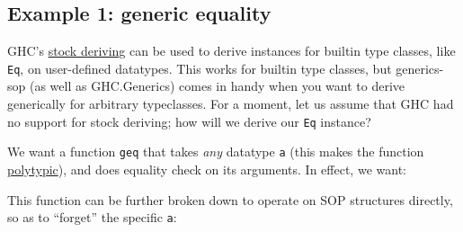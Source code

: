 \hypertarget{example-1-generic-equality}{%
\subsection{Example 1: generic
equality}\label{example-1-generic-equality}}

GHC's
\href{https://ghc.gitlab.haskell.org/ghc/doc/users_guide/exts/deriving_strategies.html\#deriving-strategies}{stock
deriving} can be used to derive instances for builtin type classes, like
\texttt{Eq}, on user-defined datatypes. This works for builtin type
classes, but generics-sop (as well as GHC.Generics) comes in handy when
you want to derive generically for arbitrary typeclasses. For a moment,
let us assume that GHC had no support for stock deriving; how will we
derive our \texttt{Eq} instance?

We want a function \texttt{geq} that takes \emph{any} datatype
\texttt{a} (this makes the function
\href{https://www.sciencedirect.com/science/article/pii/S0167642304000152}{polytypic}),
and does equality check on its arguments. In effect, we want:

\begin{Shaded}
\begin{Highlighting}[]
 \OtherTok{=\textgreater{}}\OtherTok{{-}\textgreater{}}\OtherTok{{-}\textgreater{}} 
\end{Highlighting}
\end{Shaded}

This function can be further broken down to operate on SOP structures
directly, so as to ``forget'' the specific \texttt{a}:

\begin{Shaded}
\begin{Highlighting}[]
  \OtherTok{=\textgreater{}}\OtherTok{{-}\textgreater{}}\OtherTok{{-}\textgreater{}} 
\OtherTok{=}\OperatorTok{$}\OperatorTok{$}

 \NormalTok{ (} \NormalTok{) (}\OtherTok{{-}\textgreater{}} \NormalTok{ (} \NormalTok{) (}\OtherTok{{-}\textgreater{}} 
\OtherTok{=} 
\end{Highlighting}
\end{Shaded}

